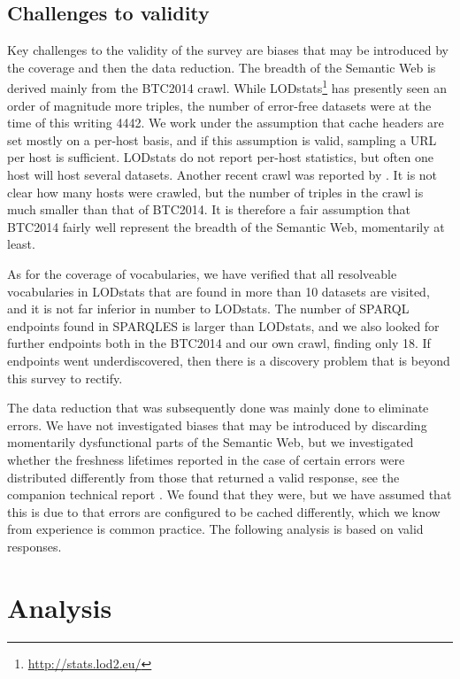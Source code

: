 \documentclass{llncs}
\begin{document}
\subsection{Challenges to validity}

Key challenges to the validity of the survey are biases that may be
introduced by the coverage and then the data reduction. The breadth of
the Semantic Web is derived mainly from the BTC2014 crawl. While
LODstats\footnote{\url{http://stats.lod2.eu/}} has presently seen an
order of magnitude more triples, the number of error-free datasets
were at the time of this writing 4442. We work under the assumption
that cache headers are set mostly on a per-host basis, and if this
assumption is valid, sampling a URL per host is sufficient. LODstats
do not report per-host statistics, but often one host will host
several datasets. Another recent crawl was reported by
\cite{stateoflod2014}. It is not clear how many hosts were crawled, but the
number of triples in the crawl is much smaller than that of
BTC2014. It is therefore a fair assumption that BTC2014 fairly well
represent the breadth of the Semantic Web, momentarily at least. 

As for the coverage of vocabularies, we have verified that all
resolveable vocabularies in LODstats that are found in more than 10
datasets are visited, and it is not far inferior in number to
LODstats. The number of SPARQL endpoints found in SPARQLES is larger
than LODstats, and we also looked for further endpoints both in the
BTC2014 and our own crawl, finding only 18. If endpoints went
underdiscovered, then there is a discovery problem that is beyond this
survey to rectify.

The data reduction that was subsequently done was mainly done to
eliminate errors. We have not investigated biases that may be
introduced by discarding momentarily dysfunctional parts of the
Semantic Web, but we investigated whether the freshness lifetimes
reported in the case of certain errors were distributed differently
from those that returned a valid response, see the companion technical
report \cite{kjernsmo_add_survey_2015}. We found that they were, but
we have assumed that this is due to that errors are configured to be
cached differently, which we know from experience is common
practice. The following analysis is based on valid responses.

\section{Analysis}
\end{document}
